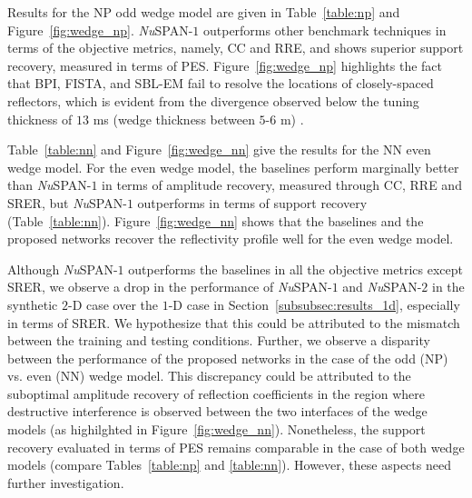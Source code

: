 \documentclass[journal]{IEEEtran}
\begin{document}
Results for the NP odd wedge model are given in Table~\ref{table:np} and Figure~\ref{fig:wedge_np}. {\it Nu}SPAN-$1$ outperforms other benchmark techniques in terms of the objective metrics, namely, CC and RRE, and shows superior support recovery, measured in terms of PES. Figure~\ref{fig:wedge_np} highlights the fact that BPI, FISTA, and SBL-EM fail to resolve the locations of closely-spaced reflectors, which is evident from the divergence observed below the tuning thickness of $13$ ms (wedge thickness between $5$-$6$ m) \cite{chung1995frequency}.

Table~\ref{table:nn} and Figure~\ref{fig:wedge_nn} give the results for the NN even wedge model. For the even wedge model, the baselines perform marginally better than {\it Nu}SPAN-$1$ in terms of amplitude recovery, measured through CC, RRE and SRER, but {\it Nu}SPAN-$1$ outperforms in terms of support recovery (Table~\ref{table:nn}). Figure~\ref{fig:wedge_nn} shows that the baselines and the proposed networks recover the reflectivity profile well for the even wedge model. 

Although {\it Nu}SPAN-$1$ outperforms the baselines in all the objective metrics except SRER, we observe a drop in the performance of {\it Nu}SPAN-$1$ and {\it Nu}SPAN-$2$ in the synthetic $2$-D case over the $1$-D case in Section~\ref{subsubsec:results_1d}, especially in terms of SRER. We hypothesize that this could be attributed to the mismatch between the training and testing conditions. Further, we observe a disparity between the performance of the proposed networks in the case of the odd (NP) vs. even (NN) wedge model. This discrepancy could be attributed to the suboptimal amplitude recovery of reflection coefficients in the region where destructive interference is observed between the two interfaces of the wedge models (as highilghted in Figure~\ref{fig:wedge_nn}). Nonetheless, the support recovery evaluated in terms of PES remains comparable in the case of both wedge models (compare Tables~\ref{table:np} and \ref{table:nn}). However, these aspects need further investigation. 
\end{document}
